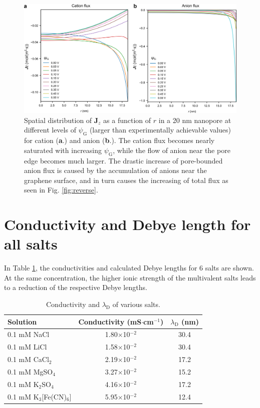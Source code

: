 \documentclass[manuscript=suppinfo,email=true, hyperref=true, keywords=false]{achemso}
\newcommand{\Fig}{Fig.}
\begin{document}
\begin{figure}[htbp]
  \centering
  \includegraphics[width=0.8\linewidth]{img/SI-flux-larger.png}
  \caption{Spatial distribution of $\boldsymbol{J}_{z}$ as a function
    of $r$ in a 20 nm nanopore at different levels of
    $\psi_{\mathrm{G}}$ (larger than experimentally achievable values)
    for cation (\textbf{a}.) and anion (\textbf{b}.). The cation flux
    becomes nearly saturated with increasing $\psi_{\mathrm{G}}$,
    while the flow of anion near the pore edge becomes much
    larger. The drastic increase of pore-bounded anion flux is caused
    by the accumulation of anions near the graphene surface, and in
    turn causes the increasing of total flux as seen in \Fig
    \ref{fig:reverse}.}
  \label{fig:large-V}
\end{figure}
\clearpage{}

\section{Conductivity and Debye length for all salts}
\label{sec:salts}
In Table \ref{tab:conductivity}, the conductivities and calculated Debye
lengths for 6 salts are shown. At the same concentration, the higher
ionic strength of the multivalent salts leads to a reduction of the
respective Debye lengths.

\begin{table}[htbp]
  \centering
  \begin{tabular}{lcc}
    \hline
    Solution & Conductivity (mS$\cdot$cm$^{-1}$) & $\lambda_{\mathrm{D}}$ (nm) \\
    \hline
    0.1 mM NaCl &1.80$\times$10$^{-2}$  &30.4\\
    0.1 mM LiCl &1.58$\times$10$^{-2}$ &30.4\\
    0.1 mM CaCl$_{2}$&  2.19$\times$10$^{-2}$ &17.2\\
    0.1 mM MgSO$_{4}$   &3.27$\times$10$^{-2}$ &15.2\\
    0.1 mM K$_{2}$SO$_{4}$      &4.16$\times$10$^{-2}$ &17.2\\
    0.1 mM K$_{3}$[Fe(CN)$_{6}$]&       5.95$\times$10$^{-2}$  &12.4\\
    \hline
  \end{tabular}
  \caption{Conductivity and $\lambda_{\mathrm{D}}$ of various salts.}
  \label{tab:conductivity}
\end{table}


\section*{}
\label{sec:ref}

\end{document}
